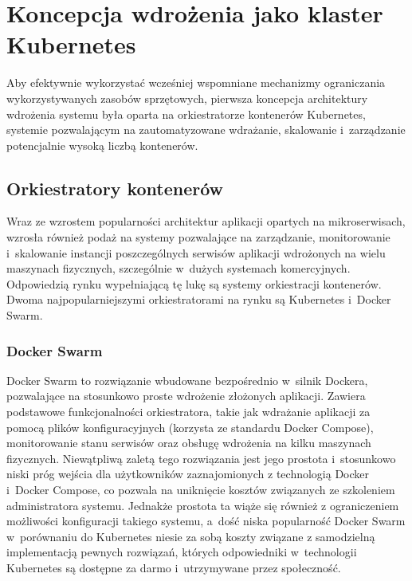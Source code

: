 \section{Koncepcja wdrożenia jako klaster Kubernetes}
Aby efektywnie wykorzystać wcześniej wspomniane mechanizmy ograniczania wykorzystywanych zasobów sprzętowych, pierwsza koncepcja architektury wdrożenia systemu była oparta na orkiestratorze kontenerów Kubernetes, systemie pozwalającym na zautomatyzowane wdrażanie, skalowanie i~zarządzanie potencjalnie wysoką liczbą kontenerów\cite{k8sMain}.

\subsection{Orkiestratory kontenerów}
Wraz ze wzrostem popularności architektur aplikacji opartych na mikroserwisach, wzrosła również podaż na systemy pozwalające na zarządzanie, monitorowanie i~skalowanie instancji poszczególnych serwisów aplikacji wdrożonych na wielu maszynach fizycznych, szczególnie w~dużych systemach komercyjnych. Odpowiedzią rynku wypełniającą tę lukę są systemy orkiestracji kontenerów. Dwoma najpopularniejszymi orkiestratorami na rynku są Kubernetes i~Docker Swarm.

\subsubsection{Docker Swarm}
Docker Swarm to rozwiązanie wbudowane bezpośrednio w~silnik Dockera, pozwalające na stosunkowo proste wdrożenie złożonych aplikacji\cite{dockerSwarm}. Zawiera podstawowe funkcjonalności orkiestratora, takie jak wdrażanie aplikacji za pomocą plików konfiguracyjnych (korzysta ze standardu Docker Compose\cite{dockerCompose}), monitorowanie stanu serwisów oraz obsługę wdrożenia na kilku maszynach fizycznych. Niewątpliwą zaletą tego rozwiązania jest jego prostota i~stosunkowo niski próg wejścia dla użytkowników zaznajomionych z technologią Docker i~Docker Compose, co pozwala na uniknięcie kosztów związanych ze szkoleniem administratora systemu. Jednakże prostota ta wiąże się również z ograniczeniem możliwości konfiguracji takiego systemu, a~dość niska popularność Docker Swarm w~porównaniu do Kubernetes niesie za sobą koszty związane z samodzielną implementacją pewnych rozwiązań, których odpowiedniki w~technologii Kubernetes są dostępne za darmo i~utrzymywane przez społeczność.

